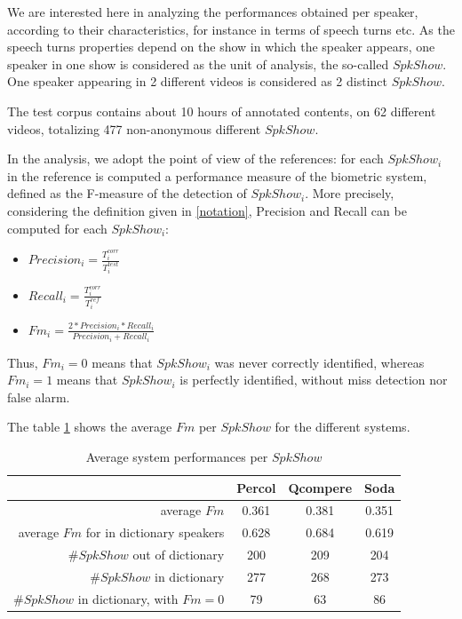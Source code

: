 We are interested here in analyzing the performances obtained per speaker, according to their characteristics, for instance in terms of speech turns etc. As the speech turns properties depend on the show in which the speaker appears, one speaker in one show is considered as the unit of analysis, the so-called $SpkShow$. One speaker appearing in 2 different videos is considered as 2 distinct $SpkShow$.

The test corpus contains about 10 hours of annotated contents, on 62 different videos, totalizing 477 non-anonymous different $SpkShow$.

In the analysis, we adopt the point of view of the references: for each $SpkShow_i$ in the reference is computed a performance measure of the biometric system, defined as the F-measure of the detection of $SpkShow_i$. More precisely, considering the definition given in \ref{notation}, Precision and Recall can be computed for each $SpkShow_i$:
\begin{itemize}
\item $Precision_i=\frac{T^{corr}_i}{T^{test}_i}$
\item $Recall_i=\frac{T^{corr}_i}{T^{ref}_i}$
\item $Fm_i=\frac{2*Precision_i*Recall_i}{Precision_i+Recall_i}$
\end{itemize} 

Thus, $Fm_i=0$ means that $SpkShow_i$ was never correctly identified, whereas $Fm_i=1$ means that $SpkShow_i$ is perfectly identified, without miss detection nor false alarm.

The table \ref{table-spkshow-perf} shows the average $Fm$ per $SpkShow$ for the different systems.
\begin{table}[t]
\begin{center}
\begin{tabular}{r||c|c|c}
& Percol & Qcompere & Soda \\\hline\hline
average $Fm$ & 0.361 & 0.381 & 0.351\\\hline
average $Fm$ for in dictionary speakers & 0.628 & 0.684 & 0.619\\\hline
\#$SpkShow$ out of dictionary & 200 & 209 & 204 \\\hline
\#$SpkShow$ in dictionary & 277& 268 & 273\\\hline
\#$SpkShow$ in dictionary, with $Fm=0$ & 79 & 63 & 86\\\hline
\end{tabular}
\caption{Average system performances per $SpkShow$}
\label{table-spkshow-perf}
\end{center}
\end{table}

